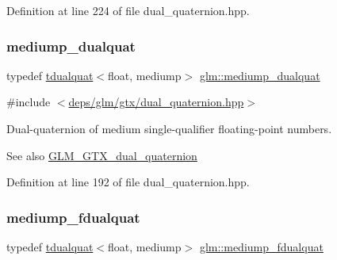 Definition at line 224 of file dual\+\_\+quaternion.\+hpp.

\mbox{\label{group__gtx__dual__quaternion_gaa88fe93eb823d1aba8d6df8028572cb5}} 
\subsubsection{\texorpdfstring{mediump\+\_\+dualquat}{mediump\_dualquat}}
{\footnotesize\ttfamily typedef \hyperlink{structglm_1_1tdualquat}{tdualquat}$<$float, mediump$>$ \hyperlink{group__gtx__dual__quaternion_gaa88fe93eb823d1aba8d6df8028572cb5}{glm\+::mediump\+\_\+dualquat}}



{\ttfamily \#include $<$\hyperlink{dual__quaternion_8hpp}{deps/glm/gtx/dual\+\_\+quaternion.\+hpp}$>$}

Dual-\/quaternion of medium single-\/qualifier floating-\/point numbers.

\begin{DoxySeeAlso}{See also}
\hyperlink{group__gtx__dual__quaternion}{G\+L\+M\+\_\+\+G\+T\+X\+\_\+dual\+\_\+quaternion} 
\end{DoxySeeAlso}


Definition at line 192 of file dual\+\_\+quaternion.\+hpp.

\mbox{\label{group__gtx__dual__quaternion_ga93e9def86ffeedd48d9c79a6afacfa6c}} 
\subsubsection{\texorpdfstring{mediump\+\_\+fdualquat}{mediump\_fdualquat}}
{\footnotesize\ttfamily typedef \hyperlink{structglm_1_1tdualquat}{tdualquat}$<$float, mediump$>$ \hyperlink{group__gtx__dual__quaternion_ga93e9def86ffeedd48d9c79a6afacfa6c}{glm\+::mediump\+\_\+fdualquat}}



